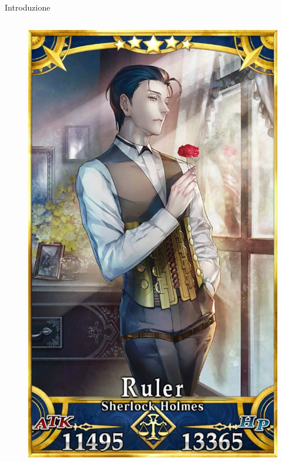 \documentclass{beamer}
\begin{document}
\begin{darkframes}
\begin{frame}{Introduzione}
\begin{columns}
\begin{column}{0.5\textwidth}
\begin{figure}
          \includegraphics[height=0.65\textheight]{./images/servant.png}
        \end{figure}
      \end{column}
    \end{columns}
  \end{frame}


\end{darkframes}
\end{document}
